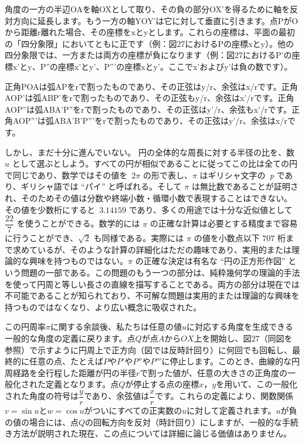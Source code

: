 \documentclass[a4paper,11pt,openany]{ltjsbook}
\providecommand{\Foreign}[1]{\textit{#1}}
\begin{document}
角度の一方の半辺OAを軸OXとして取り、その負の部分OX'を得るために軸を反対方向に延長します。もう一方の軸YOY'は它に対して垂直に引きます。点PがOから距離r離れた場合、その座標をxとyとします。これらの座標は、平面の最初の「四分象限」においてともに正です（例：図27におけるPの座標xとy）。他の四分象限では、一方または両方の座標が負になります（例：図27におけるP'の座標x'とy、P''の座標x'とy'、P'''の座標xとy'。ここでx'およびy'は負の数です）。

正角POAは弧APをrで割ったものであり、その正弦はy/r、余弦はx/rです。正角AOP'は弧ABP'をrで割ったものであり、その正弦もy/r、余弦はx'/rです。正角AOP''は弧ABA'P''をrで割ったものであり、その正弦はy'/r、余弦もx'/rです。正角AOP'''は弧ABA'B'P'''をrで割ったものであり、その正弦はy'/r、余弦はx/rです。

しかし、まだ十分に進んでいない。
円の全体的な周長に対する半径の比を、数~$u$ として選ぶとしよう。すべての円が相似であることに従ってこの比は全ての円で同じであり、数学ではその値を~$2\pi$ の形で表し、$\pi$ はギリシャ文字の~\Foreign{p} であり、ギリシャ語では ``パイ'' と呼ばれる。そして $\pi$ は無比数であることが証明され、そのためその値は分数や終端小数・循環小数で表現することはできない。その値を少数桁にすると~$3.14159$ であり、多くの用途では十分な近似値として~$\dfrac{22}{7}$ を使うことができる。数学的には $\pi$ の正確な計算は必要とする精度まで容易に行うことができ、$\sqrt{2}$ も同様である。実際には $\pi$ の値を小数点以下 $707$ 桁まで求めているが、そのような計算の詳細化はただの趣味であり、実用的または理論的な興味を持つものではない。$\pi$ の正確な決定は有名な ``円の正方形作図'' という問題の一部である。この問題のもう一つの部分は、純粋幾何学の理論的手法を使って円周と等しい長さの直線を描写することである。両方の部分は現在では不可能であることが知られており、不可解な問題は実用的または理論的な興味を持つものではなくなり、より広い概念に吸収された。

この円周率$\pi$に関する余談後、私たちは任意の値$u$に対応する角度を生成できる一般的な角度の定義に戻ります。点$Q$が点$A$から$OX$上を開始し、図27（同図を参照）で示すように円周上で正方向（図では反時計回り）に何回でも回転し、最終的に任意の点、たとえば$P$や$P'$や$P''$や$P'''$に停止します。このとき、曲線的な円周経路を全行程した距離が円の半径$r$で割った値が、任意の大きさの正角度の一般化された定義となります。点$Q$が停止する点の座標$x$，$y$を用いて、この一般化された角度の符号は$\dfrac{y}{r}$であり、余弦値は$\dfrac{x}{r}$です。これらの定義により、関数関係$v = \sin u$と$w = \cos u$がついにすべての正実数の$u$に対して定義されます。$u$が負の値の場合には、点$Q$の回転方向を反対（時計回り）にしますが、一般的な手続き方法が説明された現在、この点については詳細に論じる価値はありません。
\end{document}
